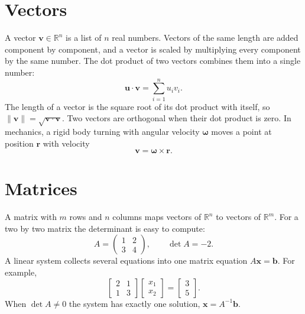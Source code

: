 \documentclass[10pt,twocolumn]{article}
\numberwithin{equation}{section}
\begin{document}
\section{Vectors}

A vector $\mathbf{v} \in \mathbb{R}^n$ is a list of $n$ real numbers. Vectors of the
same length are added component by component, and a vector is scaled by multiplying
every component by the same number. The dot product of two vectors combines them into
a single number:
\begin{equation}
  \mathbf{u} \cdot \mathbf{v} = \sum_{i=1}^{n} u_i v_i .
  \label{eq:dot}
\end{equation}
The length of a vector is the square root of its dot product with itself, so
$\|\mathbf{v}\| = \sqrt{\mathbf{v} \cdot \mathbf{v}}$. Two vectors are orthogonal when
their dot product is zero. In mechanics, a rigid body turning with angular velocity
$\bm{\omega}$ moves a point at position $\mathbf{r}$ with velocity
\begin{equation}
  \mathbf{v} = \bm{\omega} \times \mathbf{r}.
  \label{eq:cross}
\end{equation}

\section{Matrices}

A matrix with $m$ rows and $n$ columns maps vectors of $\mathbb{R}^n$ to vectors of
$\mathbb{R}^m$. For a two by two matrix the determinant is easy to compute:
\begin{equation}
  A = \begin{pmatrix} 1 & 2 \\ 3 & 4 \end{pmatrix},
  \qquad \det A = -2 .
  \label{eq:matrix}
\end{equation}
A linear system collects several equations into one matrix equation $A\mathbf{x} =
\mathbf{b}$. For example,
\begin{equation}
  \begin{bmatrix} 2 & 1 \\ 1 & 3 \end{bmatrix}
  \begin{bmatrix} x_1 \\ x_2 \end{bmatrix}
  =
  \begin{bmatrix} 3 \\ 5 \end{bmatrix}.
  \label{eq:system}
\end{equation}
When $\det A \neq 0$ the system has exactly one solution, $\mathbf{x} = A^{-1}\mathbf{b}$.
\end{document}
